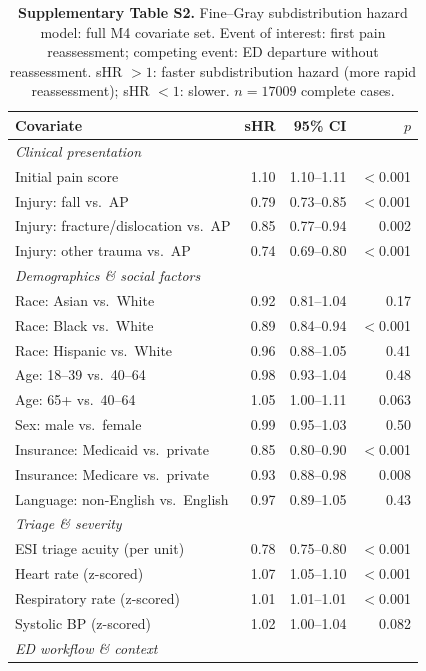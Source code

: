 \documentclass[11pt]{article}
\begin{document}
\begin{table}[htbp]
  \centering
  \caption{\textbf{Supplementary Table S2.} Fine--Gray subdistribution hazard model: full M4 covariate set.
  Event of interest: first pain reassessment; competing event: ED departure without reassessment.
  sHR $>1$: faster subdistribution hazard (more rapid reassessment); sHR $<1$: slower.
  $n=\num{17009}$ complete cases.}
  \label{tab:finegray}
  \begin{tabular}{lrrr}
\toprule
Covariate & sHR & 95\% CI & $p$ \\
\midrule
\multicolumn{4}{l}{\textit{Clinical presentation}} \\
Initial pain score & 1.10 & 1.10--1.11 & $<$0.001 \\
Injury: fall vs.\ AP & 0.79 & 0.73--0.85 & $<$0.001 \\
Injury: fracture/dislocation vs.\ AP & 0.85 & 0.77--0.94 & 0.002 \\
Injury: other trauma vs.\ AP & 0.74 & 0.69--0.80 & $<$0.001 \\
\midrule
\multicolumn{4}{l}{\textit{Demographics \& social factors}} \\
Race: Asian vs.\ White & 0.92 & 0.81--1.04 & 0.17 \\
Race: Black vs.\ White & 0.89 & 0.84--0.94 & $<$0.001 \\
Race: Hispanic vs.\ White & 0.96 & 0.88--1.05 & 0.41 \\
Age: 18--39 vs.\ 40--64 & 0.98 & 0.93--1.04 & 0.48 \\
Age: 65+ vs.\ 40--64 & 1.05 & 1.00--1.11 & 0.063 \\
Sex: male vs.\ female & 0.99 & 0.95--1.03 & 0.50 \\
Insurance: Medicaid vs.\ private & 0.85 & 0.80--0.90 & $<$0.001 \\
Insurance: Medicare vs.\ private & 0.93 & 0.88--0.98 & 0.008 \\
Language: non-English vs.\ English & 0.97 & 0.89--1.05 & 0.43 \\
\midrule
\multicolumn{4}{l}{\textit{Triage \& severity}} \\
ESI triage acuity (per unit) & 0.78 & 0.75--0.80 & $<$0.001 \\
Heart rate (z-scored) & 1.07 & 1.05--1.10 & $<$0.001 \\
Respiratory rate (z-scored) & 1.01 & 1.01--1.01 & $<$0.001 \\
Systolic BP (z-scored) & 1.02 & 1.00--1.04 & 0.082 \\
\midrule
\multicolumn{4}{l}{\textit{ED workflow \& context}} \\

\end{tabular}
\end{table}
\end{document}
